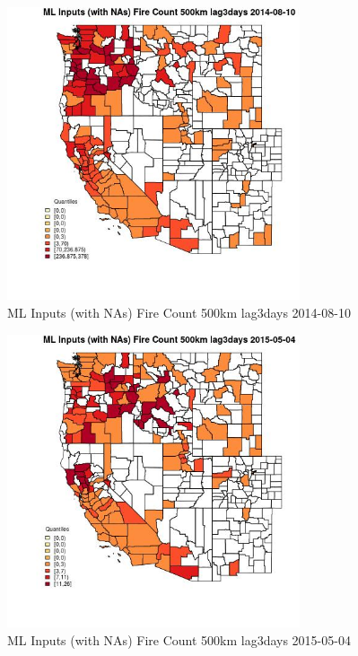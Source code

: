 \begin{figure} 
\centering  
\includegraphics[width=0.77\textwidth]{Code_Outputs/Report_ML_input_PM25_Step4_part_e_de_duplicated_aves_compiled_2019-05-18wNAs_CountyFire_Count_500km_lag3daysMean2014-08-10_2014-08-10.jpg} 
\caption{\label{fig:Report_ML_input_PM25_Step4_part_e_de_duplicated_aves_compiled_2019-05-18wNAsCountyFire_Count_500km_lag3daysMean2014-08-10_2014-08-10}ML Inputs (with NAs) Fire Count 500km lag3days 2014-08-10} 
\end{figure} 
 

\begin{figure} 
\centering  
\includegraphics[width=0.77\textwidth]{Code_Outputs/Report_ML_input_PM25_Step4_part_e_de_duplicated_aves_compiled_2019-05-18wNAs_CountyFire_Count_500km_lag3daysMean2015-05-04_2015-05-04.jpg} 
\caption{\label{fig:Report_ML_input_PM25_Step4_part_e_de_duplicated_aves_compiled_2019-05-18wNAsCountyFire_Count_500km_lag3daysMean2015-05-04_2015-05-04}ML Inputs (with NAs) Fire Count 500km lag3days 2015-05-04} 
\end{figure} 
 

